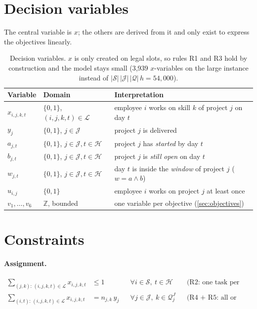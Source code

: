 \documentclass[10pt,a4paper]{article}
\theoremstyle{plain}
\theoremstyle{definition}
\theoremstyle{remark}
\newcommand{\Hor}{\mathcal{H}}
\newcommand{\Q}{\mathcal{Q}}
\newcommand{\Sset}{\mathcal{S}}
\newcommand{\J}{\mathcal{J}}
\newcommand{\Leg}{\mathcal{L}}
\newcommand{\QJ}[1]{\mathcal{Q}^{J}_{#1}}
\begin{document}
\section{Decision variables}

The central variable is $x$; the others are derived from it and only exist to express the
objectives linearly.

\begin{table}[!htbp]
\centering\small
\begin{tabularx}{\linewidth}{@{}l l X@{}}
\toprule
\textbf{Variable} & \textbf{Domain} & \textbf{Interpretation} \\
\midrule
$x_{i,j,k,t}$ & $\{0,1\}$, $(i,j,k,t)\in\Leg$ & employee $i$ works on skill $k$ of project $j$ on day $t$ \\
$y_j$ & $\{0,1\}$, $j\in\J$ & project $j$ is delivered \\
$a_{j,t}$ & $\{0,1\}$, $j\in\J,t\in\Hor$ & project $j$ has \emph{started} by day $t$ \\
$b_{j,t}$ & $\{0,1\}$, $j\in\J,t\in\Hor$ & project $j$ is \emph{still open} on day $t$ \\
$w_{j,t}$ & $\{0,1\}$, $j\in\J,t\in\Hor$ & day $t$ is inside the \emph{window} of project $j$ ($w=a\wedge b$) \\
$u_{i,j}$ & $\{0,1\}$ & employee $i$ works on project $j$ at least once \\
$v_1,\dots,v_6$ & $\mathbb{Z}$, bounded & one variable per objective (\cref{sec:objectives}) \\
\bottomrule
\end{tabularx}
\caption{Decision variables. $x$ is only created on legal slots, so rules R1 and R3 hold by
construction and the model stays small (3{,}939 $x$-variables on the large instance instead of
$|\Sset|\,|\J|\,|\Q|\,h = 54{,}000$).}
\label{tab:variables}
\end{table}

\section{Constraints}

\paragraph{Assignment.}
\begin{align}
\sum_{(j,k):\,(i,j,k,t)\in\Leg} x_{i,j,k,t} &\le 1
  && \forall i\in\Sset,\ t\in\Hor && \text{(R2: one task per day)} \label{c:day}\\
\sum_{(i,t):\,(i,j,k,t)\in\Leg} x_{i,j,k,t} &= n_{j,k}\, y_j
  && \forall j\in\J,\ k\in\QJ{j} && \text{(R4 + R5: all or nothing, once)} \label{c:cover}
\end{align}
\end{document}
